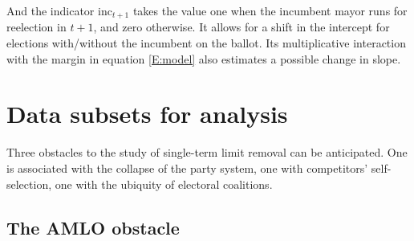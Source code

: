 \documentclass[letter,12pt]{article}
\begin{document}

And the indicator $\text{inc}_{t+1}$ takes the value one when the incumbent mayor runs for reelection in $t+1$, and zero otherwise. It allows for a shift in the intercept for elections with/without the incumbent on the ballot. Its multiplicative interaction with the margin in equation \ref{E:model} also estimates a possible change in slope.

\section{Data subsets for analysis}

\noindent Three obstacles to the study of single-term limit removal can be anticipated. One is associated with the collapse of the party system, one with competitors' self-selection, one with the ubiquity of electoral coalitions.

\subsection{The AMLO obstacle}
\end{document}
